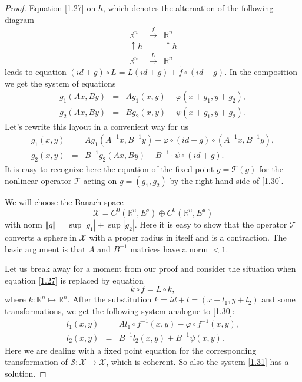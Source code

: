 \begin{theorem}
\begin{proof}
		Equation \eqref{1.27} on $ h $, which denotes the alternation of the following diagram
		$$
		\begin{array}{ccc}
		\mathbb{R}^{n} & \overset{f}{\longmapsto } & \mathbb{R}^{n} \\
		\uparrow h &  & \uparrow h \\
		\mathbb{R}^{n} & \overset{L}{\longmapsto } & \mathbb{R}^{n}%
		\end{array}%
		$$
		leads to equation $\left( id+g\right) \circ L=L (id+g)+\tilde{f} \circ (id+g)$. In the composition we get the system of equations
		$$
		\begin{array}{lll}
		g_{1}(Ax,By) & = & A g_{1}(x,y)+\varphi (x+g_{1},y+g_{2}), \\
		g_{2}(Ax,By) & = & B g_{2}(x,y)+\psi (x+g_{1},y+g_{2}).
		\end{array}
		$$
		Let's rewrite this layout in a convenient way for us
		\begin{equation}
		\label{1.30}
		\begin{array}{lll}
		g_{1}(x,y) & = & A g_{1}(A^{-1}x,B^{-1}y)+\varphi \circ (id+g)\circ
		(A^{-1}x,B^{-1}y), \\
		g_{2}(x,y) & = & B^{-1} g_{2}(Ax,By)-B^{-1}\cdot \psi \circ (id+g).%
		\end{array}
		\end{equation}
		It is easy to recognize here the equation of the fixed point $ g = \mathcal {T} (g) $ for the nonlinear operator $ \mathcal {T} $ acting on $ g = (g_ {1}, g_ {2}) $ by the right hand side of \eqref{1.30}.
		
		We will choose the Banach space
		$$
		\mathcal{X}=C^{0}(\mathbb{R}^{n},E^{s})\oplus C^{0}(\mathbb{R}^{n},E^{u})
		$$
		with norm $\left\Vert g\right\Vert =\sup \left\vert g_{1}\right\vert +\sup
		\left\vert g_{2}\right\vert $. Here it is easy to show that the operator $ \mathcal {T} $ converts a sphere in $ \mathcal {X} $ with a proper radius in itself and is a contraction. The basic argument is that $ A $ and $ B ^ {- 1} $ matrices have a norm $ <1 $.
		
		Let us break away for a moment from our proof and consider the situation when equation \eqref{1.27} is replaced by equation
		\begin{equation}
		\label{1.31}
		k\circ f=L\circ k,
		\end{equation}
		where $k:\mathbb{R}^{n}\longmapsto \mathbb{R}^{n}$. After the substitution $k=id+l=(x+l_{1},y+l_{2})$ and some transformations, we get the following system analogue to \eqref{1.30}:
		$$
		\begin{array}{lll}
		l_{1}(x,y) & = & Al_{1}\circ f^{-1}(x,y)-\varphi \circ f^{-1}(x,y), \\
		l_{2}(x,y) & = & B^{-1}l_{2}(x,y)+B^{-1}\psi (x,y).%
		\end{array}%
		$$
		Here we are dealing with a fixed point equation for the corresponding transformation of $ \mathcal {S}: \mathcal {X} \longmapsto \mathcal {X} $, which is coherent. So also the system \eqref{1.31} has a solution.
		

\end{proof}
\end{theorem}
